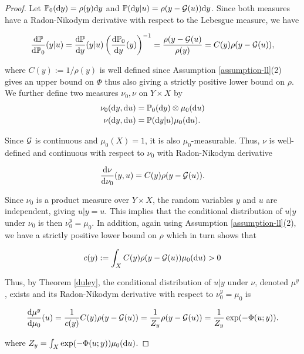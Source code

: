\begin{proof}
  Let $\mathbb{P}_0(\text{d} y) = \rho(y)\text{d} y$ and $\mathbb{P}(\text{d} y|u) = \rho(y - \mathcal{G} (u))\text{d} y$. Since both measures have a Radon-Nikodym derivative with respect to the Lebesgue measure, we have

  \begin{equation*}
    \frac{\text{d} \mathbb{P}}{\text{d} \mathbb{P}_0}(y|u) = \frac{\text{d} \mathbb{P}}{\text{d} y}(y|u)\left(\frac{\text{d} \mathbb{P}_0}{\text{d} y}(y)\right)^{-1} = \frac{\rho(y - \mathcal{G} (u)}{\rho(y)} = C(y)\rho(y - \mathcal{G} (u)),
  \end{equation*}

  where $C(y) := 1 / \rho(y)$ is well defined since Assumption \ref{assumption-ll}(2) gives an upper bound on $\Phi$ thus also giving a strictly positive lower bound on $\rho$. We further define two measures $\nu_0, \nu$ on $Y \times X$ by
  \begin{equation*}
    \begin{aligned}
      \nu_0(\text{d} y, \text{d} u) &= \mathbb{P}_0(\text{d} y) \otimes \mu_0(\text{d} u)\\
      \nu(\text{d} y, \text{d} u) &= \mathbb{P}(\text{d} y|u) \mu_0(\text{d} u).
    \end{aligned}
  \end{equation*}
  
  Since $\mathcal{G}$ is continuous and $\mu_0(X) = 1$, it is also $\mu_0$-measurable. Thus, $\nu$ is well-defined and continuous with respect to $\nu_0$ with Radon-Nikodym derivative

  \begin{equation*}
    \frac{\text{d} \nu}{\text{d} \nu_0}(y, u) = C(y)\rho(y - \mathcal{G}(u)).
  \end{equation*}

  Since $\nu_0$ is a product measure over $Y \times X$, the random variables $y$ and $u$ are independent, giving $u|y = u$. This implies that the conditional distribution of $u|y$ under $\nu_0$ is then $\nu_0^y = \mu_0$. In addition, again using Assumption \ref{assumption-ll}(2), we have a strictly positive lower bound on $\rho$ which in turn shows that

  \begin{equation*}
    c(y) := \int_X C(y)\rho(y - \mathcal{G}(u))\mu_0(\text{d} u) > 0 
  \end{equation*}

  Thus, by Theorem \ref{duley}, the conditional distribution of $u|y$ under $\nu$, denoted $\mu^y$, exists and its Radon-Nikodym derivative with respect to $\nu_0^y = \mu_0$ is

  \begin{equation*}
    \frac{\text{d} \mu^y}{\text{d} \mu_0}(u) = \frac1{c(y)}C(y)\rho(y - \mathcal{G} (u)) =  \frac1{Z_y}\rho(y - \mathcal{G} (u)) = \frac1{Z_y}\exp(-\Phi(u;y)).
  \end{equation*}
  
  where $Z_y = \int_X\exp(-\Phi(u;y))\mu_0(\text{d} u)$.
\end{proof}

